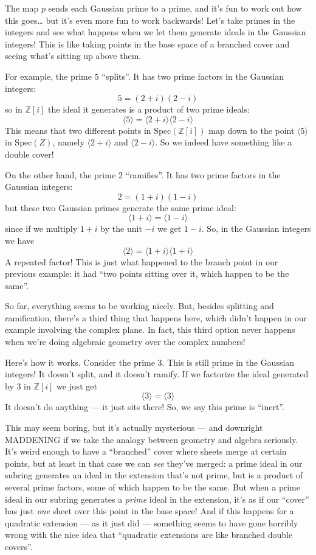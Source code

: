 \documentclass{article}
\begin{document}
The map \(p\) sends each Gaussian prime to a prime, and it's fun to work
out how this goes\ldots{} but it's even more fun to work backwards!
Let's take primes in the integers and see what happens when we let them
generate ideals in the Gaussian integers! This is like taking points in
the base space of a branched cover and seeing what's sitting up above
them.

For example, the prime \(5\) ``splits''. It has two prime factors in the
Gaussian integers: \[5 = (2 + i)(2 - i)\] so in \(\mathbb{Z}[i]\) the
ideal it generates is a product of two prime ideals:
\[\langle 5\rangle = \langle 2 + i\rangle \langle 2 - i\rangle\] This
means that two different points in \(\mathrm{Spec}(\mathbb{Z}[i])\) map
down to the point \(\langle 5\rangle\) in \(\mathrm{Spec}(Z)\), namely
\(\langle 2 + i\rangle\) and \(\langle 2 - i\rangle\). So we indeed have
something like a double cover!

On the other hand, the prime \(2\) ``ramifies''. It has two prime
factors in the Gaussian integers: \[2 = (1 + i)(1 - i)\] but these two
Gaussian primes generate the same prime ideal:
\[\langle 1 + i\rangle = \langle 1 - i\rangle\] since if we multiply
\(1+i\) by the unit \(-i\) we get \(1-i\). So, in the Gaussian integers
we have \[\langle 2\rangle = \langle 1 + i\rangle \langle 1 + i\rangle\]
A repeated factor! This is just what happened to the branch point in our
previous example: it had ``two points sitting over it, which happen to
be the same''.

So far, everything seems to be working nicely. But, besides splitting
and ramification, there's a third thing that happens here, which didn't
happen in our example involving the complex plane. In fact, this third
option never happens when we're doing algebraic geometry over the
complex numbers!

Here's how it works. Consider the prime \(3\). This is still prime in
the Gaussian integers! It doesn't split, and it doesn't ramify. If we
factorize the ideal generated by \(3\) in \(\mathbb{Z}[i]\) we just get
\[\langle 3\rangle = \langle 3\rangle\] It doesn't do anything --- it
just sits there! So, we say this prime is ``inert''.

This may seem boring, but it's actually mysterious --- and downright
MADDENING if we take the analogy between geometry and algebra seriously.
It's weird enough to have a ``branched'' cover where sheets merge at
certain points, but at least in that case we can \emph{see} they've
merged: a prime ideal in our subring generates an ideal in the extension
that's not prime, but is a product of several prime factors, some of
which happen to be the same. But when a prime ideal in our subring
generates a \emph{prime} ideal in the extension, it's as if our
``cover'' has just \emph{one} sheet over this point in the base space!
And if this happens for a quadratic extension --- as it just did ---
something seems to have gone horribly wrong with the nice idea that
``quadratic extensions are like branched double covers''.
\end{document}
